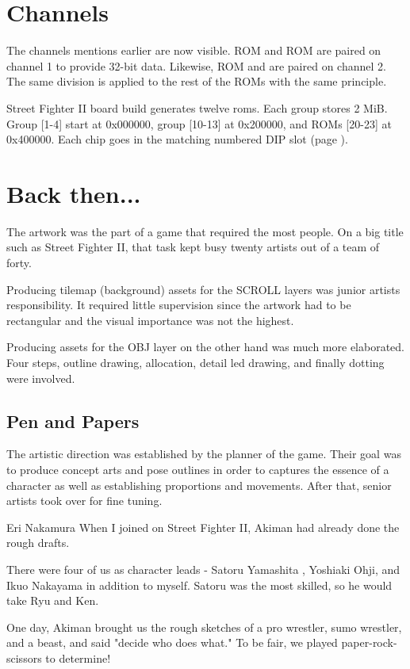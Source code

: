 
\section{Channels}\label{channels}
The channels mentions earlier are now visible. ROM  and ROM  are paired on channel 1 to provide 32-bit data. Likewise, ROM  and  are paired on channel 2. The same division is applied to the rest of the ROMs with the same principle. 


Street Fighter II board build generates twelve roms. Each group stores 2 MiB. Group [1-4] start at 0x000000, group [10-13] at 0x200000, and ROMs [20-23] at 0x400000. Each chip goes in the matching numbered DIP slot (page \pageref{boardb_no_chips}).










\section{Back then...}

The artwork was the part of a game that required the most people. On a big title such as Street Fighter II, that task kept busy twenty artists out of a team of forty.

Producing tilemap (background) assets for the SCROLL layers was junior artists responsibility. It required little supervision since the artwork had to be rectangular and the visual importance was not the highest.

Producing assets for the OBJ layer on the other hand was much more elaborated. Four steps, outline drawing, allocation, detail led drawing, and finally dotting were involved.



\subsection{Pen and Papers}
The artistic direction was established by the planner of the game. Their goal was to produce concept arts and pose outlines in order to captures the essence of a character as well as establishing proportions and movements. After that, senior artists took over for fine tuning.

\begin{q}{Eri Nakamura\cite{sf2devinterview}}
When I joined on Street Fighter II, Akiman had already done the rough drafts. 

There were four of us as character leads - Satoru Yamashita , Yoshiaki Ohji, and Ikuo Nakayama in addition to myself. Satoru was the most skilled, so he would take Ryu and Ken. 

One day, Akiman brought us the rough sketches of a pro wrestler, sumo wrestler, and a beast, and said "decide who does what." To be fair, we played paper-rock-scissors to determine!
\end{q}



